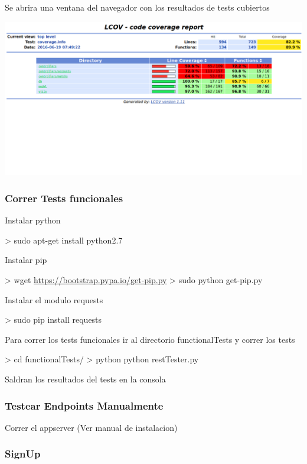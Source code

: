 \documentclass[letterpaper,10pt,english]{sphinxmanual}
\begin{document}
Se abrira una ventana del navegador con los resultados de tests cubiertos

\includegraphics{coverage.png}


\subsubsection{Correr Tests funcionales}
\label{manuals:correr-tests-funcionales}
Instalar python

\textgreater{} sudo apt-get install python2.7

Instalar pip

\textgreater{} wget \href{https://bootstrap.pypa.io/get-pip.py}{https://bootstrap.pypa.io/get-pip.py}
\textgreater{} sudo python get-pip.py

Instalar el modulo requests

\textgreater{} sudo pip install requests

Para correr los tests funcionales ir al directorio functionalTests y correr los tests

\textgreater{} cd functionalTests/
\textgreater{} python python restTester.py

Saldran los resultados del tests en la consola


\subsubsection{Testear Endpoints Manualmente}
\label{manuals:testear-endpoints-manualmente}
Correr el appserver (Ver manual de instalacion)


\subsubsection{SignUp}
\label{manuals:id2}
\end{document}
